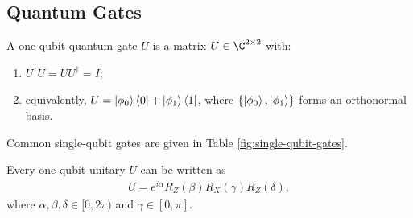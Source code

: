 \subsection{Quantum Gates}

\begin{definition}
A one-qubit quantum gate $U$ is a matrix $U \in \C^{2 \times 2}$ with:
\begin{enumerate}
    \item $U^\dagger U = UU^\dagger = I$;
    \item equivalently, $U = \ket{\phi_0}\bra0 + \ket{\phi_1}\bra1$, where $\{\ket{\phi_0}, \ket{\phi_1}\}$ forms an orthonormal basis.
\end{enumerate}
Common single-qubit gates are given in Table \ref{fig:single-qubit-gates}.
\end{definition}



\begin{theorem}
\label{thm:euler-decomposition}
Every one-qubit unitary $U$ can be written as
\begin{align}
U = e^{i\alpha} R_Z(\beta) R_X(\gamma) R_Z(\delta),
\end{align}
where $\alpha,\beta,\delta \in [0,2\pi)$ and $\gamma \in [0,\pi]$.
\end{theorem}

